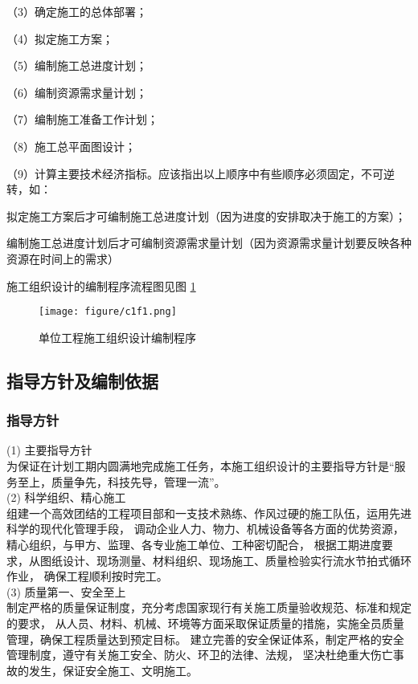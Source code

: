 （3）确定施工的总体部署；

（4）拟定施工方案；

（5）编制施工总进度计划；

（6）编制资源需求量计划；

（7）编制施工准备工作计划；

（8）施工总平面图设计；

（9）计算主要技术经济指标。应该指出以上顺序中有些顺序必须固定，不可逆转，如：

 拟定施工方案后才可编制施工总进度计划（因为进度的安排取决于施工的方案）；

 编制施工总进度计划后才可编制资源需求量计划（因为资源需求量计划要反映各种资源在时间上的需求）

施工组织设计的编制程序流程图见图 \ref{fig:c1f1}

\begin{figure}[thbp!]
    \centering
    \texttt{[image: figure/c1f1.png]}
    \caption{单位工程施工组织设计编制程序}
    \label{fig:c1f1}
\end{figure}

\subsection{指导方针及编制依据}

\subsubsection{指导方针}

(1) 主要指导方针\\

为保证在计划工期内圆满地完成施工任务，本施工组织设计的主要指导方针是“服务至上，质量争先，科技先导，管理一流”。\\

(2) 科学组织、精心施工\\

组建一个高效团结的工程项目部和一支技术熟练、作风过硬的施工队伍，运用先进科学的现代化管理手段，
调动企业人力、物力、机械设备等各方面的优势资源，精心组织，与甲方、监理、各专业施工单位、工种密切配合，
根据工期进度要求，从图纸设计、现场测量、材料组织、现场施工、质量检验实行流水节拍式循环作业，
确保工程顺利按时完工。\\

(3) 质量第一、安全至上\\

制定严格的质量保证制度，充分考虑国家现行有关施工质量验收规范、标准和规定的要求，
从人员、材料、机械、环境等方面采取保证质量的措施，实施全员质量管理，确保工程质量达到预定目标。
建立完善的安全保证体系，制定严格的安全管理制度，遵守有关施工安全、防火、环卫的法律、法规，
坚决杜绝重大伤亡事故的发生，保证安全施工、文明施工。\\

